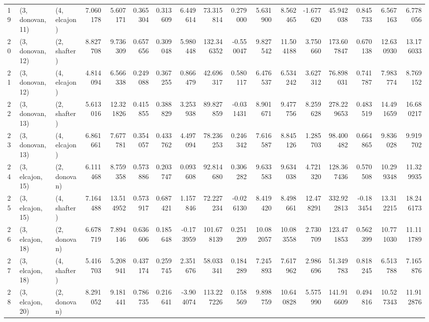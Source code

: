 \begin{tabular}{lllrrrrrrrrrrrrrr}
19 &  (3, donovan, 11) &     (4, elcajon) &   7.060178 &   5.607171 &   0.365304 &  0.313609 &   6.449614 &   73.315814 &  0.279000 &   5.631900 &   8.562465 &  -1.677620 &    45.942038 &  0.845733 &   6.567163 &   6.778056 \\
20 &  (3, donovan, 12) &     (2, shafter) &   8.827708 &   9.736309 &   0.657656 &  0.309048 &   5.980448 &  132.346352 & -0.550047 &   9.827542 &  11.504188 &   3.750660 &   173.607847 &  0.670138 &  12.630930 &  13.176033 \\
21 &  (3, donovan, 12) &     (4, elcajon) &   4.814094 &   6.566338 &   0.249088 &  0.367255 &   0.866479 &   42.696317 &  0.580117 &   6.476537 &   6.534242 &   3.627312 &    76.898031 &  0.741787 &   7.983774 &   8.769152 \\
22 &  (3, donovan, 13) &     (2, shafter) &   5.613016 &  12.321826 &   0.415855 &  0.388829 &   3.253938 &   89.827859 & -0.031431 &   8.901671 &   9.477756 &   8.259628 &   278.229653 &  0.483519 &  14.491659 &  16.680217 \\
23 &  (3, donovan, 13) &     (4, elcajon) &   6.861661 &   7.677781 &   0.354057 &  0.433762 &   4.497094 &   78.236253 &  0.246342 &   7.616587 &   8.845126 &   1.285703 &    98.400482 &  0.664865 &   9.836028 &   9.919702 \\
24 &  (3, elcajon, 15) &     (2, donovan) &   6.111468 &   8.759358 &   0.573886 &  0.203747 &   0.093608 &   92.814680 &  0.306282 &   9.633583 &   9.634038 &   4.721320 &   128.367436 &  0.570508 &  10.299348 &  11.329935 \\
25 &  (3, elcajon, 15) &     (4, shafter) &   7.164488 &  13.514952 &   0.573917 &  0.687421 &   1.157846 &   72.227234 & -0.026130 &   8.419420 &   8.498661 &  12.478291 &   332.922813 & -0.183454 &  13.312215 &  18.246173 \\
26 &  (3, elcajon, 18) &     (2, donovan) &   6.678719 &   7.894146 &   0.636606 &  0.185648 &  -0.173959 &  101.678139 &  0.251209 &  10.082057 &  10.083558 &   2.730709 &   123.471853 &  0.562399 &  10.771030 &  11.111789 \\
27 &  (3, elcajon, 18) &     (4, shafter) &   5.416703 &   5.208941 &   0.437174 &  0.259745 &   2.351676 &   58.033341 &  0.184289 &   7.245893 &   7.617962 &   2.986696 &    51.349783 &  0.818245 &   6.513788 &   7.165876 \\
28 &  (3, elcajon, 20) &     (2, donovan) &   8.291052 &   9.181441 &   0.786735 &  0.216641 &  -3.904074 &  113.227226 &  0.158569 &   9.898759 &  10.640828 &   5.575990 &   141.916609 &  0.494816 &  10.527343 &  11.912876 \\

\end{tabular}
